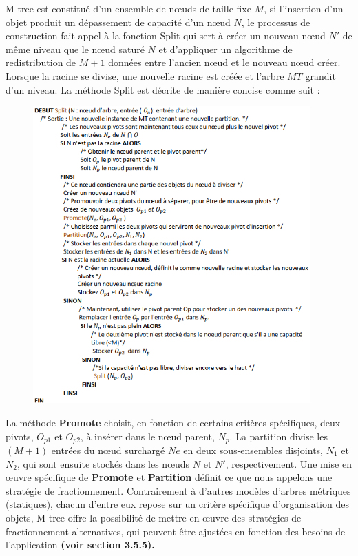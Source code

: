 M-tree est constitué d’un ensemble de nœuds de taille fixe $ M $, si l'insertion d'un objet produit un dépassement de capacité d'un nœud $ N $, le processus de construction fait appel à la fonction Split qui sert à créer un nouveau nœud $ N' $ de même niveau que le nœud saturé $ N  $ et d’appliquer un algorithme de redistribution de $ M+1 $ données entre l’ancien nœud et le nouveau nœud créer. Lorsque la racine se divise, une nouvelle racine est créée et l'arbre $ MT $ grandit d'un niveau. La méthode Split est décrite de manière concise comme suit :\\

\begin{figure}[H]
	\centering
	\includegraphics[width=0.95\textwidth]{Figures/split.png} %
\end{figure}

La méthode \textbf{Promote} choisit, en fonction de certains critères spécifiques, deux pivots, $ O_{p1} $ et $  O_{p2} $, à insérer dans le nœud parent, $ N_p $. La partition divise les $ (M + 1) $ entrées du nœud surchargé $ Ne $ en deux sous-ensembles disjoints, $ N_1 $ et $ N_2 $, qui sont ensuite stockés dans les nœuds $ N $ et $ N' $, respectivement. Une mise en œuvre spécifique de \textbf{Promote} et \textbf{Partition} définit ce que nous appelons une stratégie de fractionnement. Contrairement à d'autres modèles d'arbres métriques (statiques), chacun d'entre eux repose sur un critère spécifique d'organisation des objets, M-tree offre la possibilité de mettre en œuvre des stratégies de fractionnement alternatives, qui peuvent être ajustées en fonction des besoins de l'application \textbf{(voir section 3.5.5).}\\

